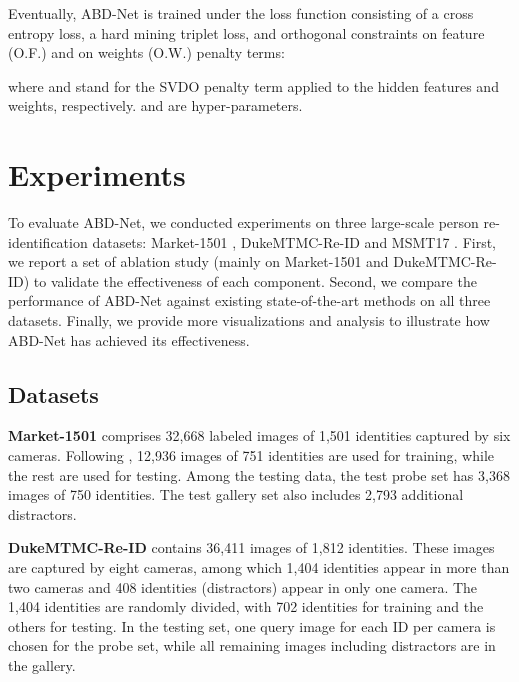 \documentclass[10pt,twocolumn]{article}
\begin{document}
Eventually, ABD-Net is trained under the loss function  consisting of a cross entropy loss, a hard mining triplet loss, and orthogonal constraints on feature (O.F.) and on weights (O.W.) penalty terms:

where  and  stand for the SVDO penalty term applied to the hidden features and weights, respectively.  and  are hyper-parameters.




















\section{Experiments} \label{sec:exp}
To evaluate ABD-Net, we conducted experiments on three large-scale person re-identification datasets: Market-1501 \cite{Zheng_2015_ICCV}, DukeMTMC-Re-ID \cite{Ristani_2016_ECCV} and MSMT17 \cite{Wei_2018_CVPR}. First, we report a set of ablation study (mainly on Market-1501 and DukeMTMC-Re-ID) to validate the effectiveness of each component. Second, we compare the performance of ABD-Net against existing state-of-the-art methods on all three datasets. Finally, we provide more visualizations and analysis to illustrate how ABD-Net has achieved its effectiveness. 

\subsection{Datasets}
{\bf Market-1501} \cite{Zheng_2015_ICCV} comprises 32,668 labeled images of 1,501 identities captured by six cameras. Following \cite{Zheng_2015_ICCV}, 12,936 images of 751 identities are used for training, while the rest are used for testing. Among the testing data, the test probe set has 3,368 images of 750 identities. The test gallery set also includes 2,793 additional distractors.

{\bf DukeMTMC-Re-ID} \cite{Ristani_2016_ECCV} contains 36,411 images of 1,812 identities. These images are captured by eight cameras, among which 1,404 identities appear in more than two cameras and 408 identities (distractors) appear in only one camera. The 1,404 identities are randomly divided, with 702 identities for training and the others for testing. In the testing set, one query image for each ID per camera is chosen for the probe set, while all remaining images including distractors are in the gallery. 
\end{document}
